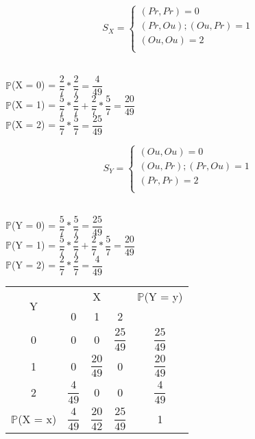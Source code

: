 \documentclass[12pt,a4paper]{article}
\begin{document}
	\vspace{1cm}
		\[
	S_{X} =
	\begin{cases}
	(Pr, Pr) = 0\\
	(Pr, Ou); (Ou, Pr) = 1\\
	(Ou, Ou) = 2\\
	\end{cases}
	\]
	\vspace{0.5cm}\\
	\begin{center}
		$\mathbb{P}$(X = 0) = $\dfrac{2}{7} * \dfrac{2}{7} = \dfrac{4}{49}$
		\vspace{0.5cm}\\
		$\mathbb{P}$(X = 1) = $\dfrac{5}{7} * \dfrac{2}{7} + \dfrac{2}{7} * \dfrac{5}{7} = \dfrac{20}{49}$
		\vspace{0.5cm}\\
		$\mathbb{P}$(X = 2) = $\dfrac{5}{7} * \dfrac{5}{7} = \dfrac{25}{49}$
	\end{center}
	\vspace{0.5cm}
	\[
	S_{Y} =
	\begin{cases}
	(Ou, Ou) = 0\\
	(Ou, Pr); (Pr, Ou) = 1\\
	(Pr, Pr) = 2\\
	\end{cases}
	\]
	\vspace{0.5cm}\\
	\begin{center}
		$\mathbb{P}$(Y = 0) = $\dfrac{5}{7} * \dfrac{5}{7} = \dfrac{25}{49}$
		\vspace{0.5cm}\\
		$\mathbb{P}$(Y = 1) = $\dfrac{5}{7} * \dfrac{2}{7} + \dfrac{2}{7} * \dfrac{5}{7} = \dfrac{20}{49}$
		\vspace{0.5cm}\\
		$\mathbb{P}$(Y = 2) = $\dfrac{2}{7} * \dfrac{2}{7} = \dfrac{4}{49}$
	\end{center}
	\vspace{1cm}
	\begin{center}
		\begin{tabular}{ccccc}
			\multirow{2}{*}{Y} & \multicolumn{3}{c}{X} & $\mathbb{P}$(Y = y)\\ \cmidrule{2-4}
			& 0 & 1 & 2 & \\ \midrule
			0 & 0 & 0 & $\dfrac{25}{49}$ & $\dfrac{25}{49}$ \\ \midrule
			1 & 0 & $\dfrac{20}{49}$ & 0 & $\dfrac{20}{49}$\\ \midrule
			2 & $\dfrac{4}{49}$ & 0 & 0 & $\dfrac{4}{49}$\\ \midrule
			$\mathbb{P}$(X = x) & $\dfrac{4}{49}$ & $\dfrac{20}{42}$ & $\dfrac{25}{49}$ & 1\\ \midrule
		\end{tabular}
	\end{center}
\end{document}
